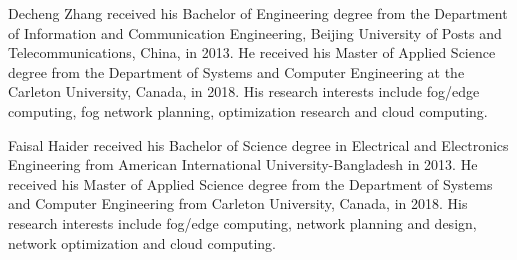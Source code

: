\documentclass[10pt,journal,compsoc]{IEEEtran}
\begin{document}


% 



\begin{IEEEbiography}
{Decheng Zhang}
received his Bachelor of Engineering degree from the Department of Information and Communication Engineering, Beijing University of Posts and Telecommunications, China, in 2013. He received his Master of Applied Science degree from the Department of Systems and Computer Engineering at the Carleton University, Canada, in 2018. His research interests include fog/edge computing, fog network planning, optimization research and cloud computing.
\end{IEEEbiography}

\begin{IEEEbiography}
{Faisal Haider}
received his Bachelor of Science degree in Electrical and Electronics Engineering from American International University-Bangladesh in 2013. He received his Master of Applied Science degree from the Department of Systems and Computer Engineering from Carleton University, Canada, in 2018. His research interests include fog/edge computing, network planning and design, network optimization and cloud computing.
\end{IEEEbiography}
\end{document}
